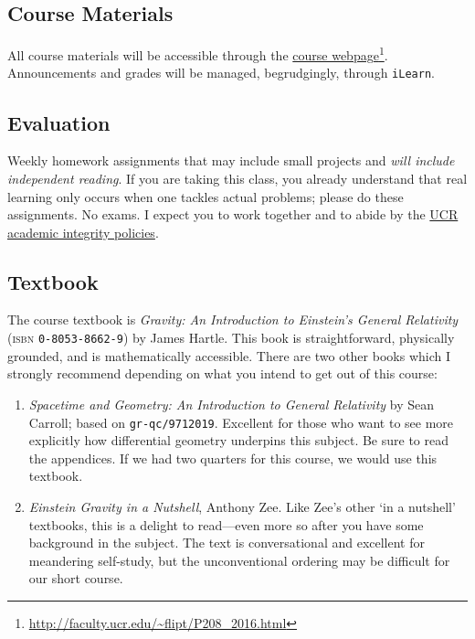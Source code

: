\documentclass[12pt]{article}
\numberwithin{equation}{section}    %
\begin{document}
\subsection*{Course Materials}

All course materials will be accessible through the \href{http://faculty.ucr.edu/~flipt/P208_2016.html}{course webpage}\footnote{\url{http://faculty.ucr.edu/~flipt/P208_2016.html}}. Announcements and grades will be managed, begrudgingly, through \texttt{iLearn}.


\subsection*{Evaluation}

Weekly homework assignments that may include small projects and \emph{will include independent reading}. If you are taking this class, you already understand that real learning only occurs when one tackles actual problems; please do these assignments. No exams. I expect you to work together and to abide by the \href{http://conduct.ucr.edu/policies/academicintegrity.html}{UCR academic integrity policies}.

\subsection*{Textbook}

The course textbook is \emph{Gravity: An Introduction to Einstein's General Relativity} (\textsc{isbn} \texttt{0-8053-8662-9}) by James Hartle. This book is straightforward, physically grounded, and is mathematically accessible. 
%
There are two other books which I strongly recommend depending on what you intend to get out of this course:
\begin{enumerate}
	\item \emph{Spacetime and Geometry: An Introduction to General Relativity} by Sean Carroll; based on \texttt{gr-qc/9712019}. Excellent for those who want to see more explicitly how differential geometry underpins this subject. Be sure to read the appendices. If we had two quarters for this course, we would use this textbook.
	\item \emph{Einstein Gravity in a Nutshell}, Anthony Zee. Like Zee's other `in a nutshell' textbooks, this is a delight to read---even more so after you have some background in the subject. The text is conversational and excellent for meandering self-study, but the unconventional ordering may be difficult for our short course.
\end{enumerate}
\end{document}
